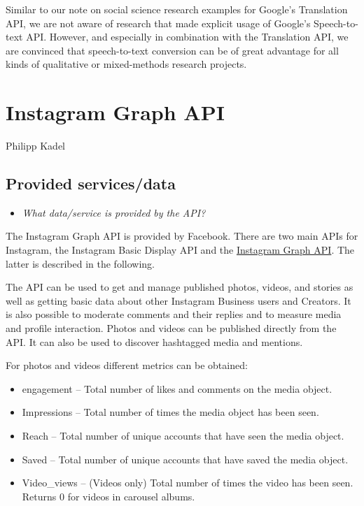 \documentclass[
]{book}
\providecommand{\tightlist}{%
  \setlength{\itemsep}{0pt}\setlength{\parskip}{0pt}}
\begin{document}
Similar to our note on social science research examples for Google's Translation API, we are not aware of research that made explicit usage of Google's Speech-to-text API.
However, and especially in combination with the Translation API, we are convinced that speech-to-text conversion can be of great advantage for all kinds of qualitative or mixed-methods research projects.

\hypertarget{instagram-graph-api}{%
\chapter{Instagram Graph API}\label{instagram-graph-api}}

Philipp Kadel

\hypertarget{provided-servicesdata-5}{%
\section{Provided services/data}\label{provided-servicesdata-5}}

\begin{itemize}
\tightlist
\item
  \emph{What data/service is provided by the API?}
\end{itemize}

The Instagram Graph API is provided by Facebook. There are two main APIs for Instagram, the Instagram Basic Display API and the \href{\%22https://developers.facebook.com/docs/instagram-api?locale=en_US\%22}{Instagram Graph API}. The latter is described in the following.

The API can be used to get and manage published photos, videos, and stories as well as getting basic data about other Instagram Business users and Creators. It is also possible to moderate comments and their replies and to measure media and profile interaction. Photos and videos can be published directly from the API. It can also be used to discover hashtagged media and mentions.

For photos and videos different metrics can be obtained:

\begin{itemize}
\tightlist
\item
  engagement -- Total number of likes and comments on the media object.
\item
  Impressions -- Total number of times the media object has been seen.
\item
  Reach -- Total number of unique accounts that have seen the media object.
\item
  Saved -- Total number of unique accounts that have saved the media object.
\item
  Video\_views -- (Videos only) Total number of times the video has been seen. Returns 0 for videos in carousel albums.
\end{itemize}
\end{document}
